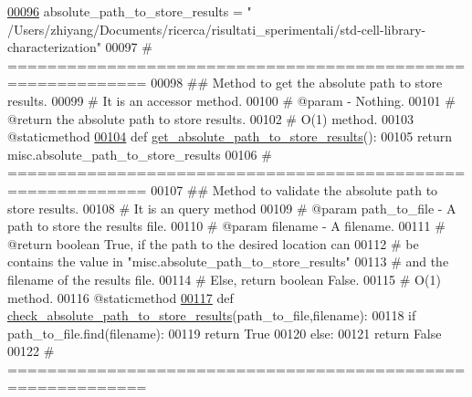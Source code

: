\begin{DoxyCode}
\hypertarget{miscellaneous_8py_source_l00096}{}\hyperlink{classutilities_1_1miscellaneous_1_1misc_a27fd16369fd0995d7494ff4741de5b91}{00096}     absolute\_path\_to\_store\_results = \textcolor{stringliteral}{"
      /Users/zhiyang/Documents/ricerca/risultati\_sperimentali/std-cell-library-characterization"}
00097     \textcolor{comment}{# ============================================================}
00098     \textcolor{comment}{##  Method to get the absolute path to store results.}
00099     \textcolor{comment}{#   It is an accessor method.}
00100     \textcolor{comment}{#   @param - Nothing.}
00101     \textcolor{comment}{#   @return the absolute path to store results.}
00102     \textcolor{comment}{#   O(1) method.}
00103     @staticmethod
\hypertarget{miscellaneous_8py_source_l00104}{}\hyperlink{classutilities_1_1miscellaneous_1_1misc_a17714d8ce76a7c4f04256b37b9938c15}{00104}     \textcolor{keyword}{def }\hyperlink{classutilities_1_1miscellaneous_1_1misc_a17714d8ce76a7c4f04256b37b9938c15}{get\_absolute\_path\_to\_store\_results}():
00105         \textcolor{keywordflow}{return} misc.absolute\_path\_to\_store\_results
00106     \textcolor{comment}{# ============================================================}
00107     \textcolor{comment}{##  Method to validate the absolute path to store results.}
00108     \textcolor{comment}{#   It is an query method}
00109     \textcolor{comment}{#   @param path\_to\_file - A path to store the results file.}
00110     \textcolor{comment}{#   @param filename - A filename.}
00111     \textcolor{comment}{#   @return boolean True, if the path to the desired location can}
00112     \textcolor{comment}{#       be contains the value in "misc.absolute\_path\_to\_store\_results"}
00113     \textcolor{comment}{#       and the filename of the results file.}
00114     \textcolor{comment}{#       Else, return boolean False.}
00115     \textcolor{comment}{#   O(1) method.}
00116     @staticmethod
\hypertarget{miscellaneous_8py_source_l00117}{}\hyperlink{classutilities_1_1miscellaneous_1_1misc_a9b5ff2b3036d8a1a2e3bacb1d25e2785}{00117}     \textcolor{keyword}{def }\hyperlink{classutilities_1_1miscellaneous_1_1misc_a9b5ff2b3036d8a1a2e3bacb1d25e2785}{check\_absolute\_path\_to\_store\_results}(path\_to\_file,filename):
00118         \textcolor{keywordflow}{if} path\_to\_file.find(filename):
00119             \textcolor{keywordflow}{return} \textcolor{keyword}{True}
00120         \textcolor{keywordflow}{else}:
00121             \textcolor{keywordflow}{return} \textcolor{keyword}{False}
00122     \textcolor{comment}{# ============================================================}

\end{DoxyCode}
